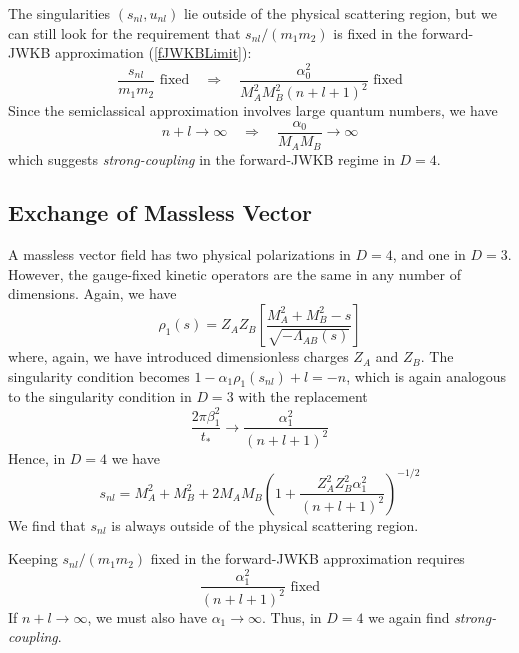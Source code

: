 The singularities $(s_{nl}, u_{nl})$ lie outside of the physical scattering region, but we can still look for the requirement that $s_{nl} / (m_{1} m_{2})$ is fixed in the forward-JWKB approximation (\ref{fJWKBLimit}):
\begin{equation}
	\frac{s_{nl}}{m_{1} m_{2}} \text{ fixed} \quad \Longrightarrow \quad \frac{\alpha_{0}^{2}}{M_{A}^{2} M_{B}^{2} (n + l + 1)^{2}} \text{ fixed}
\end{equation}
Since the semiclassical approximation involves large quantum numbers, we have
\begin{equation}
	n + l \rightarrow \infty \quad \Longrightarrow \quad \frac{\alpha_{0}}{M_{A} M_{B}} \rightarrow \infty
\end{equation}
which suggests \textit{strong-coupling} in the forward-JWKB regime in $D = 4$.
\subsection{Exchange of Massless Vector}
A massless vector field has two physical polarizations in $D = 4$, and one in $D = 3$. However, the gauge-fixed kinetic operators are the same in any number of dimensions. Again, we have
\begin{equation}
	\rho_{1}(s) = Z_{A} Z_{B} \left[ \frac{M_{A}^{2} + M_{B}^{2} - s}{\sqrt{-\Lambda_{AB}(s)}} \right]
\end{equation}
where, again, we have introduced dimensionless charges $Z_{A}$ and $Z_{B}$. The singularity condition becomes $1 - \alpha_{1} \rho_{1}(s_{nl}) + l = -n$, which is again analogous to the singularity condition in $D = 3$ with the replacement
\begin{equation}
	\frac{2 \pi \beta_{1}^{2}}{t_{*}} \longrightarrow \frac{\alpha_{1}^{2}}{(n + l + 1)^{2}}
\end{equation}
Hence, in $D = 4$ we have
\begin{equation}
	s_{nl} = M_{A}^{2} + M_{B}^{2} + 2 M_{A} M_{B} \left(1 + \frac{Z_{A}^{2} Z_{B}^{2} \alpha_{1}^{2}}{(n + l + 1)^{2}} \right)^{-1/2} \label{sJ1}
\end{equation}
We find that $s_{nl}$ is always outside of the physical scattering region.

Keeping $s_{nl}/(m_{1} m_{2})$ fixed in the forward-JWKB approximation requires
\begin{equation}
	\frac{\alpha_{1}^{2}}{(n + l + 1)^{2}} \text{ fixed}
\end{equation}
If $n + l \rightarrow \infty$, we must also have $\alpha_{1} \rightarrow \infty$. Thus, in $D = 4$ we again find \textit{strong-coupling}.
